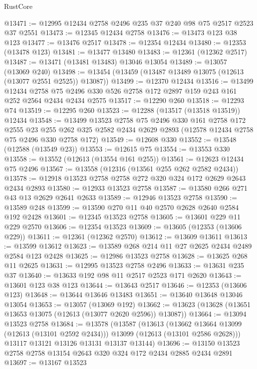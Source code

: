 \begin{lexlean}{RustCore}
\begin{coremodule}
@13471 := @12995 @12434 @2758 @2496 @235 @37 @240 @98 @75 @2517 @2523 @37 @2551
@13473 := @12345 @12434 @2758
@13476 := @13473 @123 @38 @123
@13477 := @13476 @2517
@13478 := @12354 @12434
@13480 := @12353 (@13478 @123)
@13481 := @13477 @13480
@13483 := @12361 (@12362 @2517)
@13487 := @13471 (@13481 @13483) @13046 @13054
@13489 := @13057 (@13069 @240)
@13498 := @13454 (@13459 (@13487 @13489 @13075 (@12613 (@13077 @2551 @2525)) @13087))
@13499 := @12370 @12434
@13516 := @13499
    @12434
    @2758
    @75
    @2496
    @330
    @526
    @2758
    @172
    @2897
    @159
    @243
    @161
    @252
    @2564
    @2434
    @2434
    @2575
@13517 := @12290 @260
@13518 := @12293 @74
@13519 := @12295 @260
@13523 := @12288 (@13517 (@13518 @13519)) @12434
@13548 := @13499
    @13523
    @2758
    @75
    @2496
    @330
    @161
    @2758
    @172
    @2555
    @23
    @255
    @262
    @325
    @2582
    @2434
    @2629
    @2893
    (@12578 @12434 @2758 @75 @2496 @330 @2758 @172)
@13549 := @12608 @330
@13552 := @13548 (@12588 (@13549 @23))
@13553 := @12615 @75
@13554 := @13553 @330
@13558 := @13552 (@12613 (@13554 @161 @255))
@13561 := @12623 @12434 @75 @2496
@13567 := @13558 (@12316 (@13561 @255 @262 @2582 @2434))
@13578 := @12918 @13523 @2758 @2758 @272 @320 @324 @172 @2629 @2643 @2434 @2893
@13580 := @12933 @13523 @2758
@13587 := @13580 @266 @271 @43 @13 @2629 @2641 @2633
@13589 := @12946 @13523 @2758
@13590 := @13589 @248
@13599 := @13590 @270 @11 @40 @2570 @2628 @2640 @2584 @192 @2428
@13601 := @12345 @13523 @2758
@13605 := @13601 @229 @11 @229 @2570
@13606 := @12354 @13523
@13609 := @13605 (@12353 (@13606 @229))
@13611 := @12361 (@12362 @2570)
@13612 := @13609 @13611
@13613 := @13599 @13612
@13623 := @13589 @268 @214 @11 @27 @2625 @2434 @2489 @2584 @123 @2428
@13625 := @12986 @13523 @2758
@13628 := @13625 @268 @11 @2625
@13631 := @12995 @13523 @2758 @2496
@13633 := @13631 @235 @37
@13640 := @13633 @192 @98 @11 @2517 @2523 @171 @2620
@13643 := @13601 @123 @38 @123
@13644 := @13643 @2517
@13646 := @12353 (@13606 @123)
@13648 := @13644 @13646 @13483
@13651 := @13640 @13648 @13046 @13054
@13653 := @13057 (@13069 @192)
@13662 := @13623 (@13628 (@13651 @13653 @13075 (@12613 (@13077 @2620 @2596)) @13087))
@13664 := @13094 @13523 @2758
@13684 := @13578
    (@13587
      (@13613
        (@13662 @13664 @13099 (@12613 (@13101 @2592 @2434)))
        @13099
        (@12613 (@13101 @2586 @2628)))
      @13117
      @13121
      @13126
      @13131
      @13137
      @13144)
@13696 := @13150 @13523 @2758 @2758 @13154 @2643 @320 @324 @172 @2434 @2885 @2434 @2891
@13697 := @13167 @13523

\end{coremodule}
\end{lexlean}
